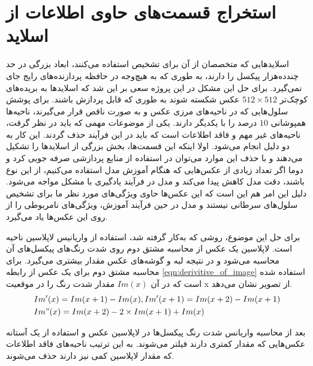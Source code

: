\section{استخراج قسمت‌های حاوی اطلاعات از اسلاید}\label{subsec:استخراج قسمت‌های حاوی اطلاعات از اسلاید}

اسلاید‌هایی که متخصصان از آن برای تشخیص استفاده می‌کنند، ابعاد بزرگی در حد چند‌ده‌هزار پیکسل را دارند، به طوری که به هیچ‌وجه در
حافظه پردازنده‌های رایج جای نمی‌گیرد.
برای حل این مشکل در این پروژه سعی بر این شد که اسلاید‌ها به بریده‌های کوچک‌تر
$512\times512$
 عکس شکسته شوند به طوری که قابل پردازش باشند.
 برای پوشش سلول‌هایی که در ناحیه‌های مرزی عکس و به صورت ناقص قرار می‌گیرند، ناحیه‌‌ها همپوشانی $10$ درصد را با یکدیگر دارند.
یکی از موضوعات مهمی که باید در نظر گرفت، ناحیه‌های غیر مهم و فاقد اطلاعات است که باید در این فرآیند حذف گردند. این کار به دو دلیل انجام می‌شود.
اولا اینکه این قسمت‌ها، بخش بزرگی از اسلاید‌ها را تشکیل می‌دهند و با حذف این موارد می‌توان در استفاده از منابع پردازشی صرفه جویی کرد
و دوما اگر تعداد زیادی از عکس‌هایی که هنگام آموزش مدل استفاده می‌کنیم، از این نوع باشند، دقت مدل کاهش پیدا می‌کند و مدل در فرآیند یادگیری با مشکل مواجه می‌شود.
دلیل این امر هم این است که این عکس‌ها حاوی ویژگی‌های مورد نظر ما برای تشخیص سلول‌های سرطانی نیستند و مدل در حین فرآیند آموزش، ویژگی‌های نامربوطی را از روی این عکس‌ها یاد می‌گیرد.

برای حل این موضوع، روشی که به‌کار گرفته شد، استفاده از واریانیس لاپلاسین ناحیه است.
لاپلاسین یک عکس از محاسبه مشتق دوم روی شدت رنگ‌های پیکسل‌های آن محاسبه می‌شود
و در نتیجه لبه و گوشه‌های عکس مقدار بیشتری می‌گیرد.
برای محاسبه مشتق دوم برای یک عکس از رابطه \ref{eqn:derivitive_of_image} استفاده شده است که در آن $Im(x)$ مقدار شدت رنگ را در موقعیت x از تصویر نشان می‌دهد.
\begin{equation}
	\label{eqn:derivitive_of_image}
		\begin{split}
			   & Im'(x) = Im(x+1) - Im(x), Im'(x+1) = Im(x+2) - Im(x+1)\\
			   & Im"(x) = Im(x+2) - 2 \times Im(x+1) + Im(x)
		\end{split}
\end{equation}

بعد از محاسبه واریانس شدت رنگ پیکسل‌ها در لاپلاسین عکس و استفاده از یک آستانه عکس‌هایی که مقدار کمتری دارند فیلتر می‌شوند.
به این ترتیب ناحیه‌های فاقد اطلاعات که مقدار لاپلاسین کمی نیز دارند حذف می‌شوند.

